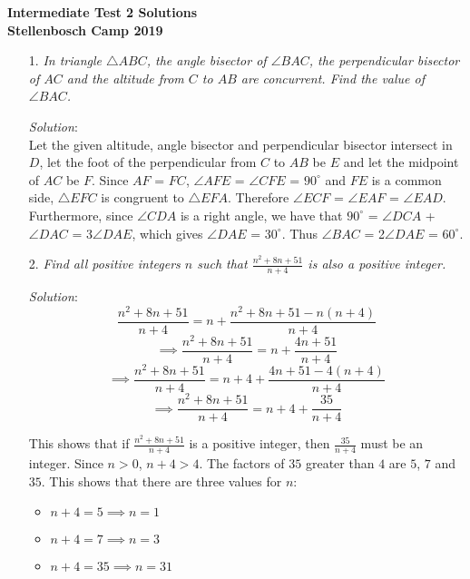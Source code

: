 \documentclass{article}
\begin{document}
\begin{center}
  \textbf{\Large Intermediate Test 2 Solutions}
  \\ \vspace{1em}
  \textbf{\large Stellenbosch Camp 2019}
\end{center}


\begin{enumerate}[1.]

\item[1.] %
\textit{In triangle $\triangle ABC$, the angle bisector of $\angle BAC$, the perpendicular bisector of $AC$ and the altitude from $C$ to $AB$ are concurrent. Find the value of $\angle BAC$.}

\textit{Solution}:
\\
Let the given altitude, angle bisector and perpendicular bisector intersect in $D$, let the foot of the perpendicular from $C$ to $AB$ be $E$ and let the midpoint of $AC$ be $F$. Since $AF$ = $FC$, $\angle AFE$ = $\angle CFE$ = $90^{\circ}$
and $FE$ is a common side, $\triangle EFC$ is congruent to $\triangle EFA$. Therefore $\angle ECF$ = $\angle EAF $ = $\angle EAD$. Furthermore, since $\angle CDA$ is a right angle, we have that $90^{\circ}$ =  $\angle DCA$ + $\angle DAC$ = 3$\angle DAE$, which gives $\angle DAE$ = $30^{\circ}$. Thus $\angle BAC$ = 2$\angle DAE$ = $60^{\circ}$.

\item[2.] %
\textit{Find all positive integers $n$ such that $\frac{n^2 + 8n + 51}{n + 4}$ is also a positive integer.}

\textit{Solution}:
$$\frac{n^2 + 8n + 51}{n + 4} = n + \frac{n^2 + 8n + 51 - n(n + 4)}{n + 4}$$
$$\implies \frac{n^2 + 8n + 51}{n + 4} = n + \frac{4n + 51}{n + 4}$$
$$\implies \frac{n^2 + 8n + 51}{n + 4} = n + 4 + \frac{4n + 51 - 4(n + 4)}{n + 4}$$
$$\implies \frac{n^2 + 8n + 51}{n + 4} = n + 4 + \frac{35}{n + 4}$$

This shows that if $\frac{n^2 + 8n + 51}{n + 4}$ is a positive integer, then $\frac{35}{n + 4}$ must be an integer. Since $n > 0$, $n + 4 > 4$.
The factors of $35$ greater than $4$ are $5$, $7$ and $35$. This shows that there are three values for $n$:
\begin{itemize}
    \item $n + 4 = 5 \implies n = 1$
    \item $n + 4 = 7 \implies n = 3$
    \item $n + 4 = 35 \implies n = 31$
\end{itemize}


\end{enumerate}
\end{document}
